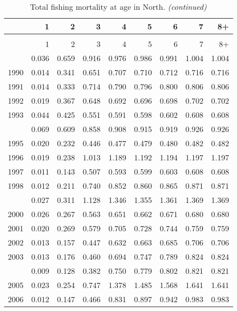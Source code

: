 \documentclass[
]{article}
\begin{document}
\begin{longtable}[t]{lrrrrrrrr}
\caption{\label{tab:North-region-FAA-table}Total fishing mortality at age in North.}\\
\toprule
  & 1 & 2 & 3 & 4 & 5 & 6 & 7 & 8+\\
\midrule
\endfirsthead
\caption[]{Total fishing mortality at age in North. \textit{(continued)}}\\
\toprule
  & 1 & 2 & 3 & 4 & 5 & 6 & 7 & 8+\\
\midrule
\endhead

\endfoot
\bottomrule
\endlastfoot
1989 & 0.036 & 0.659 & 0.916 & 0.976 & 0.986 & 0.991 & 1.004 & 1.004\\
1990 & 0.014 & 0.341 & 0.651 & 0.707 & 0.710 & 0.712 & 0.716 & 0.716\\
1991 & 0.014 & 0.333 & 0.714 & 0.790 & 0.796 & 0.800 & 0.806 & 0.806\\
1992 & 0.019 & 0.367 & 0.648 & 0.692 & 0.696 & 0.698 & 0.702 & 0.702\\
1993 & 0.044 & 0.425 & 0.551 & 0.591 & 0.598 & 0.602 & 0.608 & 0.608\\
\addlinespace
1994 & 0.069 & 0.609 & 0.858 & 0.908 & 0.915 & 0.919 & 0.926 & 0.926\\
1995 & 0.020 & 0.232 & 0.446 & 0.477 & 0.479 & 0.480 & 0.482 & 0.482\\
1996 & 0.019 & 0.238 & 1.013 & 1.189 & 1.192 & 1.194 & 1.197 & 1.197\\
1997 & 0.011 & 0.143 & 0.507 & 0.593 & 0.599 & 0.603 & 0.608 & 0.608\\
1998 & 0.012 & 0.211 & 0.740 & 0.852 & 0.860 & 0.865 & 0.871 & 0.871\\
\addlinespace
1999 & 0.027 & 0.311 & 1.128 & 1.346 & 1.355 & 1.361 & 1.369 & 1.369\\
2000 & 0.026 & 0.267 & 0.563 & 0.651 & 0.662 & 0.671 & 0.680 & 0.680\\
2001 & 0.020 & 0.269 & 0.579 & 0.705 & 0.728 & 0.744 & 0.759 & 0.759\\
2002 & 0.013 & 0.157 & 0.447 & 0.632 & 0.663 & 0.685 & 0.706 & 0.706\\
2003 & 0.013 & 0.176 & 0.460 & 0.694 & 0.747 & 0.789 & 0.824 & 0.824\\
\addlinespace
2004 & 0.009 & 0.128 & 0.382 & 0.750 & 0.779 & 0.802 & 0.821 & 0.821\\
2005 & 0.023 & 0.254 & 0.747 & 1.378 & 1.485 & 1.568 & 1.641 & 1.641\\
2006 & 0.012 & 0.147 & 0.466 & 0.831 & 0.897 & 0.942 & 0.983 & 0.983\\

\end{longtable}
\end{document}
